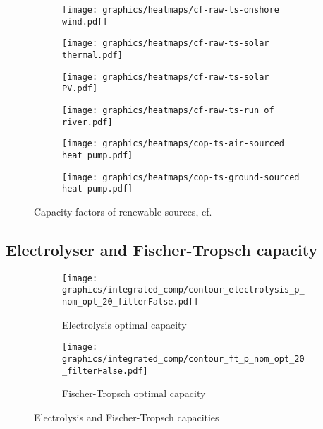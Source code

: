 \clearpage
\begin{figure}
    \centering
        \begin{subfigure}[h]{0.49\textwidth}
            \centering
        \texttt{[image: graphics/heatmaps/cf-raw-ts-onshore wind.pdf]}
    \end{subfigure}
    \begin{subfigure}[h]{0.49\textwidth}
        \centering
        \texttt{[image: graphics/heatmaps/cf-raw-ts-solar thermal.pdf]}
    \end{subfigure}
    \begin{subfigure}[h]{0.49\textwidth}
        \centering
        \texttt{[image: graphics/heatmaps/cf-raw-ts-solar PV.pdf]}
    \end{subfigure}
    \begin{subfigure}[h]{0.49\textwidth}
        \centering
        \texttt{[image: graphics/heatmaps/cf-raw-ts-run of river.pdf]}
    \end{subfigure}
    \begin{subfigure}[h]{0.49\textwidth}
        \centering
        \texttt{[image: graphics/heatmaps/cop-ts-air-sourced heat pump.pdf]}
    \end{subfigure}
    \begin{subfigure}[h]{0.49\textwidth}
        \centering
        \texttt{[image: graphics/heatmaps/cop-ts-ground-sourced heat pump.pdf]}
    \end{subfigure}
    \caption{Capacity factors of renewable sources, cf. \cite{Neumann2022}}
    \label{fig:ren-cfs}
\end{figure}



\subsection{Electrolyser and Fischer-Tropsch capacity}


\begin{figure*}[h] %
    \centering
    \begin{subfigure}[b]{0.45\linewidth}
        \centering
        \texttt{[image: graphics/integrated\_comp/contour\_electrolysis\_p\_nom\_opt\_20\_filterFalse.pdf]}
        \caption{Electrolysis optimal capacity}
        \label{fig:ely-p-nom-opt}
    \end{subfigure}
    \hfill
    \begin{subfigure}[b]{0.45\linewidth}
        \centering
        \texttt{[image: graphics/integrated\_comp/contour\_ft\_p\_nom\_opt\_20\_filterFalse.pdf]}
        \caption{Fischer-Tropsch optimal capacity}
        \label{fig:ft-p-nom-opt}
    \end{subfigure}

    \hfill

    \caption{Electrolysis and Fischer-Tropsch capacities}
    \label{fig:ely-ft-p-nom-opt}
\end{figure*}

\clearpage